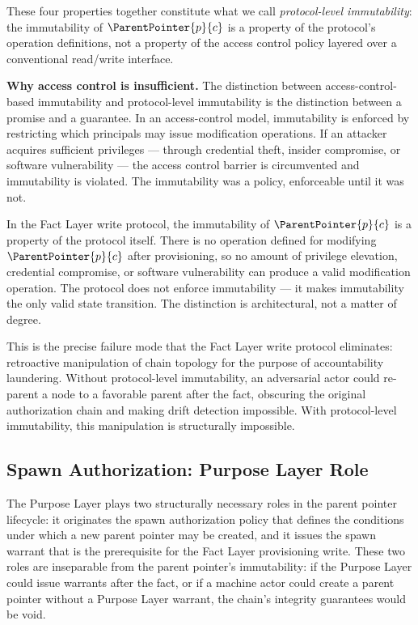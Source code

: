 These four properties together constitute what we call \emph{protocol-level immutability}: the immutability of $\ParentPointer{p}{c}$ is a property of the protocol's operation definitions, not a property of the access control policy layered over a conventional read/write interface.

\bigskip
\noindent\textbf{Why access control is insufficient.} The distinction between access-control-based immutability and protocol-level immutability is the distinction between a promise and a guarantee. In an access-control model, immutability is enforced by restricting which principals may issue modification operations. If an attacker acquires sufficient privileges --- through credential theft, insider compromise, or software vulnerability --- the access control barrier is circumvented and immutability is violated. The immutability was a policy, enforceable until it was not.

In the Fact Layer write protocol, the immutability of $\ParentPointer{p}{c}$ is a property of the protocol itself. There is no operation defined for modifying $\ParentPointer{p}{c}$ after provisioning, so no amount of privilege elevation, credential compromise, or software vulnerability can produce a valid modification operation. The protocol does not enforce immutability --- it makes immutability the only valid state transition. The distinction is architectural, not a matter of degree.

This is the precise failure mode that the Fact Layer write protocol eliminates: retroactive manipulation of chain topology for the purpose of accountability laundering. Without protocol-level immutability, an adversarial actor could re-parent a node to a favorable parent after the fact, obscuring the original authorization chain and making drift detection impossible. With protocol-level immutability, this manipulation is structurally impossible.

\subsection{Spawn Authorization: Purpose Layer Role}
\label{sec:purpose-layer-spawn-authorization}

The Purpose Layer plays two structurally necessary roles in the parent pointer lifecycle: it originates the spawn authorization policy that defines the conditions under which a new parent pointer may be created, and it issues the spawn warrant that is the prerequisite for the Fact Layer provisioning write. These two roles are inseparable from the parent pointer's immutability: if the Purpose Layer could issue warrants after the fact, or if a machine actor could create a parent pointer without a Purpose Layer warrant, the chain's integrity guarantees would be void.

